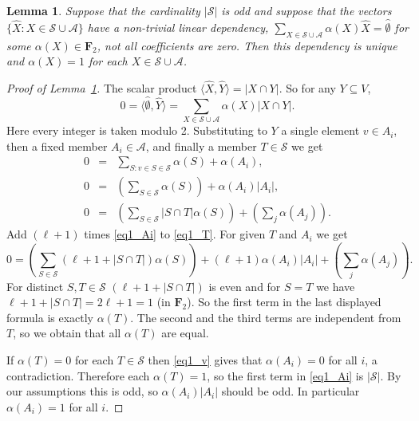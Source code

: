 \documentclass[12pt,a4paper]{amsart}
\numberwithin{equation}{section}
\theoremstyle{plain}
\newtheorem{Lemma}[Th]{Lemma}
\theoremstyle{definition}
\def\vec#1{\widehat{#1}}
\def\bbF{{\mathbf F}}
\def\cA{{\mathcal{A}}}
\def\cS{{\mathcal{S}}}
\begin{document}
\begin{Lemma} \label{lemma_1}
Suppose that the cardinality $|\cS|$ is odd and
 suppose that the vectors $\{ \vec{X} : X\in \cS\cup \cA \}$
 have a non-trivial linear dependency, $\sum_{X\in \cS\cup \cA} \alpha (X)\vec{X} = \vec{\emptyset}$ for some
 $\alpha(X) \in \bbF_2$, not all coefficients are zero. Then this dependency is unique and $\alpha(X)=1$ for each $X\in \cS\cup \cA$.
\end{Lemma}

\begin{proof}[Proof of Lemma~\ref{lemma_1}]
The scalar product $\langle \vec{X}, \vec{Y} \rangle = |X\cap Y|$.
So for any $Y\subseteq V$,
$$ 0= \langle \vec{\emptyset}, \vec{Y} \rangle = \sum _{X\in \cS\cup \cA} \alpha (X)|X\cap Y| .
$$
Here every integer is taken modulo 2.
Substituting to $Y$ a single element $v\in A_i$, then a fixed member $A_i\in \cA$, and finally a member $T\in \cS$ we get
\begin{eqnarray}
0 &=& \sum_{S: v\in S\in \cS} \alpha(S) + \alpha(A_i), \label{eq1_v}\\
0 &=& \left( \sum_{S\in \cS} \alpha(S) \right) +\alpha(A_i)|A_i|,\label{eq1_Ai}\\
0 &=& \left( \sum_{S\in \cS} |S\cap T|\alpha(S) \right) +\left( \sum _j \alpha(A_j)\right).  \label{eq1_T}
\end{eqnarray}
Add $(\ell+1)$ times \eqref{eq1_Ai} to \eqref{eq1_T}. For given $T$ and $A_i$ we get
$$
 0 = \left( \sum_{S\in \cS} (\ell+1+ |S\cap T|)\alpha(S) \right)+ (\ell+1)\alpha(A_i)|A_i| +\left( \sum _j \alpha(A_j)\right).
  $$
For distinct $S,T\in \cS$  $(\ell+1+ |S\cap T|)$ is even and for $S=T$ we have $\ell+1+ |S\cap T|=2\ell+1=1$ (in $\bbF_2$).
So the first term in the last displayed formula is exactly $\alpha(T)$. The second and the third terms are independent from $T$, so we obtain that all $\alpha(T)$ are equal.

If $\alpha(T)=0$ for each $T\in \cS$ then \eqref{eq1_v} gives that $\alpha(A_i)=0$ for all $i$, a contradiction.
Therefore each $\alpha(T)=1$, so the first term in \eqref{eq1_Ai} is $|\cS|$. By our assumptions this is odd, so $\alpha(A_i)|A_i|$ should be odd. In particular $\alpha(A_i)=1$ for all $i$.
\end{proof}
\end{document}
